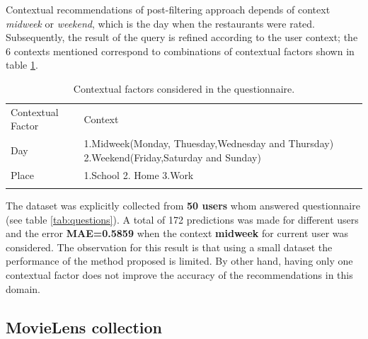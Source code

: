 Contextual recommendations of post-filtering approach depends of
context \textit{midweek} or \textit{weekend}, which is the day when
the restaurants were rated. Subsequently, the result of the query is
refined according to the user context; the 6 contexts mentioned
correspond to combinations of contextual factors shown in table
\ref{tab:contextstijuana}.
\begin{table}
\small
\captionsetup{font=footnotesize}
\caption{Contextual factors considered in the questionnaire.}
\label{tab:contextstijuana} 
\centering
\small
\begin{tabular}{p{2.5cm} p{7cm} }
\hline\noalign{\smallskip}
Contextual Factor & Context \\
\noalign{\smallskip}\hline\noalign{\smallskip}
\small{Day} & \small{1.Midweek(Monday, Thuesday,Wednesday and Thursday) 
2.Weekend(Friday,Saturday and Sunday)}  \\ \hline 
\small{Place} & \small{1.School 2. Home 3.Work} \\ 
\noalign{\smallskip}\hline
\end{tabular}
\end{table}
The dataset was explicitly collected from \textbf{50 users} whom
answered questionnaire (see table \ref{tab:questions}). A total of 172
predictions was made for different users and the error
\textbf{MAE=0.5859} when the context \textbf{midweek} for current user
was considered. The observation for this result is that using a small
dataset the performance of the method proposed is limited. By other
hand, having only one contextual factor does not improve the accuracy
of the recommendations in this domain.

\subsection{MovieLens collection} 

